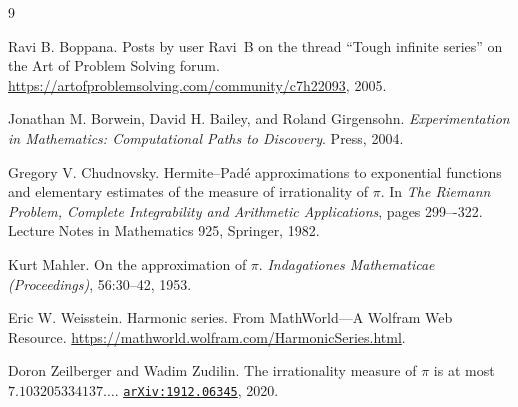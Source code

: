 \documentclass[12pt]{article}
\theoremstyle{plain}
\newcommand{\arxiv}[1]{\href{http://arxiv.org/abs/#1}{\texttt{arXiv:#1}}}
\begin{document}
\begin{thebibliography}{9}

Ravi B. Boppana.
\newblock Posts by user Ravi~B on the thread ``Tough infinite series'' on the Art of Problem Solving forum.   
\newblock \url{https://artofproblemsolving.com/community/c7h22093}, 2005.

Jonathan M. Borwein, David H. Bailey, and Roland Girgensohn.
\newblock \emph{Experimentation in Mathematics: Computational Paths to Discovery}.
 Press, 2004.

\newblock Gregory V. Chudnovsky.
\newblock Hermite--{P}ad\'{e} approximations to exponential functions and elementary estimates of the measure of irrationality of {$\pi$}. 
\newblock In \emph{The {R}iemann Problem, Complete Integrability 
            and Arithmetic Applications}, pages 299–-322.
\newblock Lecture Notes in Mathematics 925, Springer, 1982.

Kurt Mahler.
\newblock On the approximation of {$\pi$}.
\newblock \emph{Indagationes Mathematicae (Proceedings)}, 56:30--42, 1953.

Eric W. Weisstein.
\newblock Harmonic series.
\newblock From MathWorld---A Wolfram Web Resource. 
\newblock \url{https://mathworld.wolfram.com/HarmonicSeries.html}. 

Doron Zeilberger and Wadim Zudilin.
\newblock The irrationality measure of {$\pi$} is at most {$7.103205334137\dots$}.
\newblock \arxiv{1912.06345}, 2020.

\end{thebibliography}
\end{document}
